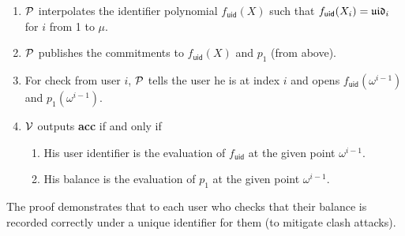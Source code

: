 

\begin{Protocol*}[t!]
\begin{mdframed}
\footnotesize


\begin{enumerate}
    \item $\mathcal{P}$ interpolates the identifier polynomial $f_\mathsf{uid}(X)$ such that $f_\mathsf{uid}(X_i)=\mathfrak{uid}_i$ for $i$ from 1 to $\mu$.
    \item $\mathcal{P}$ publishes the commitments to $f_\mathsf{uid}(X)$ and $p_1$ (from \pol above).
    \item For check from user $i$, $\mathcal{P}$ tells the user he is at index $i$ and opens $f_\mathsf{uid}(\omega^{i-1})$ and $p_1(\omega^{i-1})$.
    \item $\mathcal{V}$ outputs \textbf{acc} if and only if
    \begin{enumerate}
        \item His user identifier is the evaluation of $f_\mathsf{uid}$ at the given point $\omega^{i-1}$.
        \item His balance is the evaluation of $p_1$ at the given point $\omega^{i-1}$.
    \end{enumerate}
\end{enumerate}


\normalsize	
\end{mdframed}
\caption{The \userproof proof demonstrates that to each user who checks that their balance is recorded correctly under a unique identifier for them (to mitigate clash attacks).\label{alg:users}}
\end{Protocol*}
